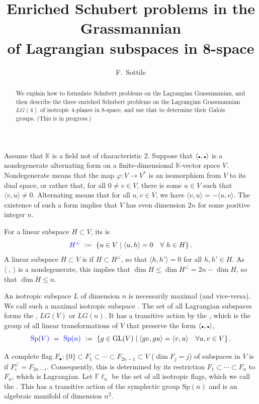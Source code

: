 \documentclass[12pt]{amsart}
\title[Enriched Schubert Problems in $\LG(4)$]{Enriched Schubert problems in the Grassmannian  \\ of Lagrangian subspaces in 8-space}
\author{F.~Sottile}
\theoremstyle{remark}
\newcommand{\GL}{\textrm{GL}}
\newcommand{\Sp}{\textrm{Sp}}
\newcommand{\Fdot}{F_\bullet}
\newcommand{\LG}{\textit{LG}}
\newcommand{\Fln}{{\mathbb F}\ell_n}
\newcommand{\KK}{{\mathbb K}}
\newcommand{\ndot}{\mbox{{\tiny$\bullet$}}}
\newcommand{\defcolor}[1]{{\color{blue}#1}}
\newcommand{\demph}[1]{\defcolor{{\sl #1}}}
\begin{document}
\begin{abstract}
  We explain how to formulate Schubert problems on the Lagrangian Grassmannian, and then
  describe the three enriched Schubert problems on the Lagrangian Grassmannian $\LG(4)$ of isotropic 4-planes in 8-space,
  and use that to determine their Galois groups. (This is in progress.)
\end{abstract}
\maketitle



Assume that $\KK$ is a field not of characteristic 2.
Suppose that $\langle\ndot,\ndot\rangle$ is a nondegenerate alternating form on a finite-dimensional $\KK$-vector space $V$.
Nondegenerate means that the map $\varphi\colon V\to V^*$ is an isomorphism from $V$ to its dual space,
or rather that, for all $0\neq v\in V$, there is some $u\in V$ such that $\langle v, u\rangle\neq 0$.
Alternating means that for all $u,v\in V$, we have $\langle v,u\rangle = - \langle u,v\rangle$.
The existence of such a form implies that $V$ has even dimension $2n$ for some positive integer $n$.

For a linear subspace $H\subset V$, its \demph{annihilator} is
\[
    \defcolor{H^\angle} \ \vcentcolon=\ \{u\in V\mid \langle u, h\rangle =0\quad\forall\ h\in H\}\,.
\]
A linear subspace $H\subset V$ is \demph{isotropic} if $H\subset H^\angle$, so that $\langle h,h'\rangle=0$
for all $h,h'\in H$.
As $\langle\:,\:\rangle$ is a nondegenerate, this implies that $\dim H \leq \dim H^\angle = 2n-\dim H$, so that
$\dim H\leq n$.

An isotropic subspace $L$ of dimension $n$ is necessarily maximal (and vice-versa).
We call such a maximal isotropic subspace \demph{Lagrangian}.
The set of all Lagrangian subspaces forms the \demph{Lagrangian Grassmannian}, \defcolor{$\LG(V)$} or \defcolor{$\LG(n)$}.
It has a transitive action by the \demph{symplectic group}, which is the group of all linear transformations of $V$ that
preserve the form $\langle\ndot,\ndot\rangle$,
\[
    \defcolor{\Sp(V)}\ =\ \defcolor{\Sp(n)}\ \vcentcolon=\
    \{ g\in \GL(V) \mid \langle gv, gu\rangle=\langle v, u\rangle\quad \forall u,v\in V\}\,.
\]

A complete flag $\Fdot\colon \{0\}\subset F_1\subset\dotsb\subset F_{2n-1}\subset V$ ($\dim F_j=j$)
of subspaces in $V$ is \demph{isotropic} if $F_i^\angle=F_{2n-i}$.
Consequently, this is determined by its restriction $F_1\subset\dotsb\subset F_n$ to $F_n$, which is Lagrangian.
Let $\Fln$ be the set of all isotropic flags, which we call the \demph{sympletic flag manifold}.
This has a transitive action of the symplectic group $\Sp(n)$ and is an algebraic manifold of dimension $n^2$.
  
\end{document}
